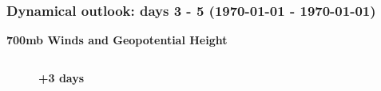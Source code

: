\documentclass[aspectratio=169, 10pt]{beamer}
\begin{document}
\begin{frame}
\frametitle{Dynamical outlook: days 3 - 5 ({\AdvanceDate[+3]\today} - {\AdvanceDate[+5]\today})}

\begin{center}
\vspace{-1.7cm}

\textbf{700mb Winds and Geopotential Height}
\end{center}
\vspace{-.5cm}


\begin{columns}
\begin{column}{0.33\textwidth}

\begin{figure}
\textbf{+3 days}\vspace{.1cm}\\
\end{figure}


\end{column}
\end{columns}
\end{frame}
\end{document}
